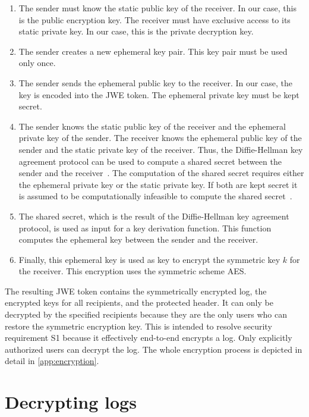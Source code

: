 \documentclass[../main.tex]{subfiles}
\begin{document}
\begin{enumerate}
    \item 
    The sender must know the static public key of the receiver. 
    In our case, this is the public encryption key.
    The receiver must have exclusive access to its static private key.
    In our case, this is the private decryption key.
    \item 
    The sender creates a new ephemeral key pair. 
    This key pair must be used only once.
    \item 
    The sender sends the ephemeral public key to the receiver.
    In our case, the key is encoded into the JWE token.
    The ephemeral private key must be kept secret.
    \item 
    The sender knows the static public key of the receiver and the ephemeral private key of the sender.
    The receiver knows the ephemeral public key of the sender and the static private key of the receiver.
    Thus, the Diffie-Hellman key agreement protocol can be used to compute a shared secret between the sender and the receiver~\cite[438]{Eckert2018}.
    The computation of the shared secret requires either the ephemeral private key or the static private key.
    If both are kept secret it is assumed to be computationally infeasible to compute the shared secret~\cite[438]{Eckert2018}.
    \item 
    The shared secret, which is the result of the Diffie-Hellman key agreement protocol, is used as input for a key derivation function.
    This function computes the ephemeral key between the sender and the receiver.
    \item 
    Finally, this ephemeral key is used as key to encrypt the symmetric key $k$ for the receiver.
    This encryption uses the symmetric scheme AES.
\end{enumerate}


The resulting JWE token contains the symmetrically encrypted log, the encrypted keys for all recipients, and the protected header.
It can only be decrypted by the specified recipients because they are the only users who can restore the symmetric encryption key.
This is intended to resolve security requirement S1 because it effectively end-to-end encrypts a log.
Only explicitly authorized users can decrypt the log.
The whole encryption process is depicted in detail in \cref{app:encryption}.

\section{Decrypting logs}\label{sec:decrypting}
\end{document}
